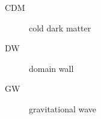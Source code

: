 


\begin{description}
    \item[CDM] cold dark matter
    \item[DW] domain wall 
    \item[GW] gravitational wave
\end{description}